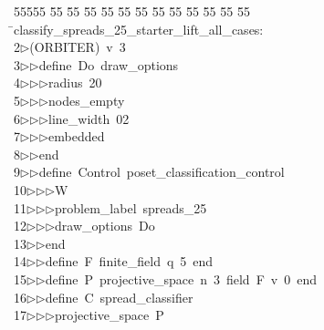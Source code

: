 %
%
\begin{tabbing}
55555 \= 55 \= 55 \= 55 \= 55 \= 55 \= 55 \= 55 \= 55 \= 55 \= 55 \= 55 \= 55 \= \>classify\_spreads\_25\_starter\_lift\_all\_cases:\\[0pt]
2\>$\triangleright$\>(ORBITER)\ v\ 3\ \\[0pt]
3\>$\triangleright$\>$\triangleright$\>define\ Do\ draw\_options\ \\[0pt]
4\>$\triangleright$\>$\triangleright$\>$\triangleright$\>radius\ 20\ \\[0pt]
5\>$\triangleright$\>$\triangleright$\>$\triangleright$\>nodes\_empty\ \\[0pt]
6\>$\triangleright$\>$\triangleright$\>$\triangleright$\>line\_width\ 02\ \\[0pt]
7\>$\triangleright$\>$\triangleright$\>$\triangleright$\>embedded\ \\[0pt]
8\>$\triangleright$\>$\triangleright$\>end\ \\[0pt]
9\>$\triangleright$\>$\triangleright$\>define\ Control\ poset\_classification\_control\ \\[0pt]
10\>$\triangleright$\>$\triangleright$\>$\triangleright$\>W\ \\[0pt]
11\>$\triangleright$\>$\triangleright$\>$\triangleright$\>problem\_label\ spreads\_25\ \\[0pt]
12\>$\triangleright$\>$\triangleright$\>$\triangleright$\>draw\_options\ Do\ \\[0pt]
13\>$\triangleright$\>$\triangleright$\>end\ \\[0pt]
14\>$\triangleright$\>$\triangleright$\>define\ F\ finite\_field\ q\ 5\ end\ \\[0pt]
15\>$\triangleright$\>$\triangleright$\>define\ P\ projective\_space\ n\ 3\ field\ F\ v\ 0\ end\ \\[0pt]
16\>$\triangleright$\>$\triangleright$\>define\ C\ spread\_classifier\ \\[0pt]
17\>$\triangleright$\>$\triangleright$\>$\triangleright$\>projective\_space\ P\ \\[0pt]

\end{tabbing}
